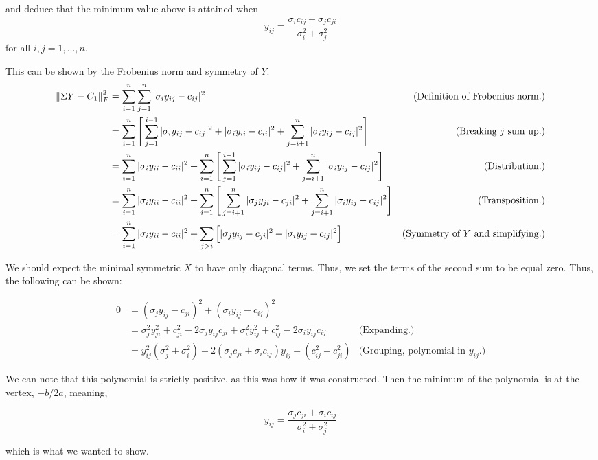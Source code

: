     and deduce that the minimum value above is attained when
    \[
    y_{ij} = \frac{\sigma_ic_{ij} + \sigma_jc_{ji}}{\sigma_i^2 + \sigma_j^2}
    \]
    for all $i, j = 1, ..., n$.
    \partbreak
    \begin{solution}

        This can be shown by the Frobenius norm and symmetry of $Y$.
{\small
        \alignbreak
        \begin{align}
            \norm{\Sigma Y - C_1}_F^2 &= \sum_{i = 1}^n\sum_{j = 1}^n |\sigma_iy_{ij} - c_{ij}|^2 &\text{(Definition of Frobenius norm.)}\nonumber\\
            &= \sum_{i = 1}^n\Bigg[ \sum_{j = 1}^{i - 1} |\sigma_iy_{ij} - c_{ij}|^2 + |\sigma_iy_{ii} - c_{ii}|^2  + \sum_{j = i+1}^n |\sigma_iy_{ij} - c_{ij}|^2\Bigg] &\text{(Breaking $j$ sum up.)}\nonumber\\
            &= \sum_{i = 1}^n|\sigma_iy_{ii} - c_{ii}|^2 + \sum_{i = 1}^n\Bigg[ \sum_{j = 1}^{i - 1} |\sigma_iy_{ij} - c_{ij}|^2 + \sum_{j = i+1}^n |\sigma_iy_{ij} - c_{ij}|^2\Bigg]&\text{(Distribution.)}\nonumber\\
            &= \sum_{i = 1}^n|\sigma_iy_{ii} - c_{ii}|^2 + \sum_{i = 1}^n\Bigg[ \sum_{j = i+1}^{n} |\sigma_jy_{ji} - c_{ji}|^2 + \sum_{j = i+1}^n |\sigma_iy_{ij} - c_{ij}|^2\Bigg]&\text{(Transposition.)}\nonumber\\
            &= \sum_{i = 1}^n|\sigma_iy_{ii} - c_{ii}|^2 + \sum_{j > i}\Big[ |\sigma_jy_{ij} - c_{ji}|^2 + |\sigma_iy_{ij} - c_{ij}|^2\Big]&\text{(Symmetry of $Y$ and simplifying.)}\nonumber
        \end{align}
}%

\alignbreak
\newpage
We should expect the minimal symmetric $X$ to have only diagonal terms. Thus, we set the terms of the second sum to be equal zero. Thus, the following can be shown:

\alignbreak
\begin{align}
    0 &= (\sigma_jy_{ij} - c_{ji})^2 + (\sigma_iy_{ij} - c_{ij})^2 \nonumber\\
    &= \sigma_j^2 y_{ji}^2 + c_{ji}^2 - 2\sigma_jy_{ij}c_{ji} + \sigma_i^2y_{ij}^2 + c_{ij}^2 - 2\sigma_iy_{ij}c_{ij} &\text{(Expanding.)}\nonumber\\
    &= y_{ij}^2(\sigma^2_j + \sigma^2_i) - 2(\sigma_jc_{ji} + \sigma_ic_{ij})y_{ij} + (c_{ij}^2 + c_{ji}^2) &\text{(Grouping, polynomial in $y_{ij}$.)}\nonumber
\end{align}
\alignbreak

We can note that this polynomial is strictly positive, as this was how it was constructed. Then the minimum of the polynomial is at the vertex, $-b/2a$, meaning,

\[
y_{ij} = \frac{\sigma_jc_{ji} + \sigma_ic_{ij}}{\sigma_i^2 + \sigma_j^2}
\]

which is what we wanted to show. 
\end{solution}

